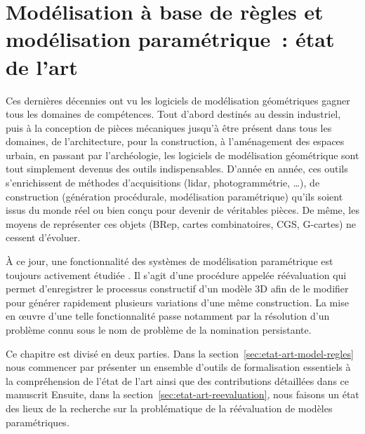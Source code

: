 \chapter[Modélisation à base de règles et modélisation paramétrique~: état
  de l'art]{Modélisation à base de règles et modélisation paramétrique~: état
  de l'art}
\label{cha:etat-art-reevaluation}


Ces dernières décennies ont vu les logiciels de modélisation géométriques gagner
tous les domaines de compétences. %
Tout d'abord destinés au dessin industriel, puis à la conception de pièces
mécaniques jusqu'à être présent dans tous les domaines, de l'architecture, pour
la construction, à l'aménagement des espaces urbain, en passant par
l'archéologie, les logiciels de modélisation géométrique sont tout simplement
devenus des outils indispensables. %
D'année en année, ces outils s'enrichissent de méthodes d'acquisitions (lidar,
photogrammétrie, …), de construction (génération procédurale, modélisation
paramétrique) qu'ils soient issus du monde réel ou bien conçu pour devenir de
véritables pièces. %
De même, les moyens de représenter ces objets (BRep, cartes combinatoires, CGS,
G-cartes) ne cessent d'évoluer. %

À ce jour, une fonctionnalité des systèmes de modélisation paramétrique est
toujours activement étudiée . %
Il s'agit d'une procédure appelée réévaluation qui permet d'enregistrer le
processus constructif d'un modèle 3D afin de le modifier pour générer rapidement
plusieurs variations d'une même construction. %
La mise en \oe uvre d'une telle fonctionnalité passe notamment par la résolution
d'un problème connu sous le nom de problème de la nomination persistante. %

Ce chapitre est divisé en deux parties. %
Dans la section~\ref{sec:etat-art-model-regles} nous commencer par présenter un
ensemble d'outils de formalisation essentiels à la compréhension de l'état de
l'art ainsi que des contributions détaillées dans ce manuscrit %
Ensuite, dans la section~\ref{sec:etat-art-reevaluation}, nous faisons un état
des lieux de la recherche sur la problématique de la réévaluation de modèles
paramétriques. %



